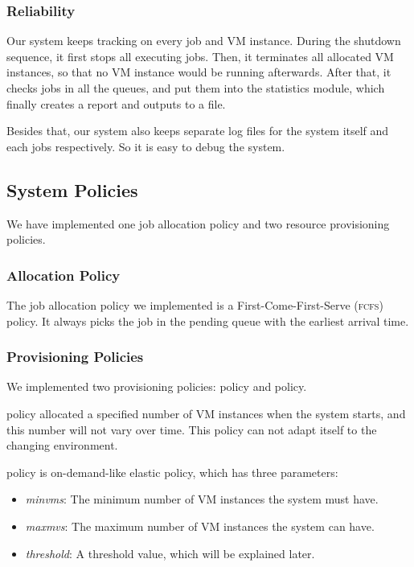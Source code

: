 \subsubsection{Reliability}
Our system keeps tracking on every job and VM instance. During the
shutdown sequence, it first stops all executing jobs. Then, it
terminates all allocated VM instances, so that no VM instance would be
running afterwards. After that, it checks jobs in all the queues, and
put them into the statistics module, which finally creates a report
and outputs to a file.

Besides that, our system also keeps separate log files for the system
itself and each jobs respectively. So it is easy to debug the system.


\subsection{System Policies}
We have implemented one job allocation policy and two resource
provisioning policies.

\subsubsection{Allocation Policy}
The job allocation policy we implemented is a First-Come-First-Serve
(\textsc{fcfs}) policy. It always picks the job in the pending queue
with the earliest arrival time.

\subsubsection{Provisioning Policies}
We implemented two provisioning policies: \policystatic policy and
\policysimpleelastic policy.

\policystatic policy allocated a specified number of VM instances when the
system starts, and this number will not vary over time. This policy
can not adapt itself to the changing environment.

\policysimpleelastic policy is on-demand-like elastic policy, which has
three parameters:

\begin{itemize}
\item \emph{minvms}: The minimum number of VM instances the system
  must have.
\item \emph{maxmvs}: The maximum number of VM instances the system can
  have.
\item \emph{threshold}: A threshold value, which will be explained
  later.
\end{itemize}

